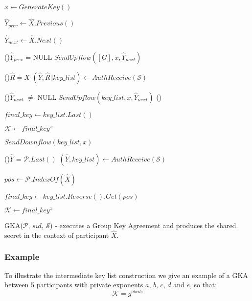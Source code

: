 \begin{algorithm}[p]
  \Begin
  {
    $x \leftarrow GenerateKey()$

    $\hat{Y}_{prev} \leftarrow \hat{X}.Previous()$

    $\hat{Y}_{next} \leftarrow \hat{X}.Next()$   

    \uIf(){$\hat{Y}_{prev}$ = NULL}
    {
      $SendUpflow([G], x, \hat{Y}_{next})$
    }
    \Else
    {
      
      \Repeat(){$\hat{R} = \hat{X}$}
      {
        $(\hat{Y}, \hat{R} \Vert key\_list) \leftarrow AuthReceive(\mathcal{S})$
      }

      {
      }
      \uIf(){$\hat{Y}_{next}$ $\neq$ NULL}
      {
        $SendUpflow(key\_list, x, \hat{Y}_{next})$
      }
      \Else()
      {
        $final\_key \leftarrow key\_list.Last()$

        $\mathcal{K} \leftarrow final\_key^x$

        $SendDownflow(key\_list, x)$

      }
    }

    \Repeat(){$\hat{Y}$ = $\mathcal{P}.Last()$}
    {
      $(\hat{Y}, key\_list) \leftarrow AuthReceive(\mathcal{S})$
    }
    {
    }
    
    $pos \leftarrow \mathcal{P}.IndexOf(\hat{X})$

    $final\_key \leftarrow key\_list.Reverse().Get(pos)$

    $\mathcal{K} \leftarrow final\_key^x$

  }
  \caption{GKA($\mathcal{P}$, $sid$, $\mathcal{S}$) - executes a Group Key Agreement and produces the shared secret in the context of participant $\hat{X}$.}
  \label{gka_proto_algo}
\end{algorithm}

\subsubsection{Example}
To illustrate the intermediate key list construction we give an example of a GKA between 5 participants with private exponents $a$, $b$, $c$, $d$ and $e$, so that:
\[
\mathcal{K} = g^{abcde}
\]

